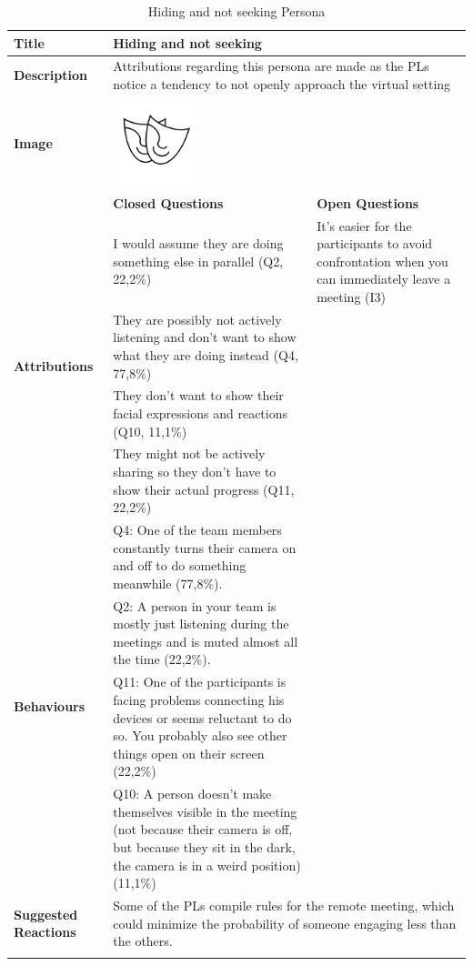 \begin{longtable}[ht]{ p{}  p{} p{} }
\caption{Hiding and not seeking Persona}
\label{tab:hiding}\\
\hline
\textbf{Title} & Hiding and not seeking \\
    \hline
   \textbf{Description} &  \multicolumn{2}{p{.80\textwidth}}{Attributions regarding this persona are made as the PLs notice a tendency to not openly approach the virtual setting} \\
   \hline
   \textbf{Image} &  \includegraphics[valign=t, width=1in, margin=0pt 3pt 0pt 3pt]{figures/Mask.png} \\
   \hline
    & \textbf{Closed Questions} & \textbf{Open Questions} \\
    \hline
    \multirow{4}{4cm}{\textbf{Attributions}}  & I would assume they are doing something else in parallel (Q2, 22,2\%) & It's easier for the participants to avoid confrontation when you can immediately leave a meeting (I3) \\
     & They are possibly not actively listening and don’t want to show what they are doing instead  (Q4, 77,8\%) \\
     & They don’t want to show their facial expressions and reactions (Q10, 11,1\%) \\
     & They might not be actively sharing so they don't have to show their actual progress (Q11, 22,2\%) \\
    \hline
    \multirow{4}{4cm}{\textbf{Behaviours}}  & Q4: One of the team members constantly turns their camera on and off to do something meanwhile (77,8\%). \\
     & Q2: A person in your team is mostly just listening during the meetings and is muted almost all the time (22,2\%). \\
 	 & Q11: One of the participants is facing problems connecting his devices or seems reluctant to do so. You probably also see other things open on their screen (22,2\%)  \\
 	 & Q10: A person doesn’t make themselves visible in the meeting (not because their camera is off, but because they sit in the dark, the camera is in a weird position) (11,1\%) \\
    \hline
     \textbf{Suggested Reactions} & \multicolumn{2}{p{.80\textwidth}}{Some of the PLs compile rules for the remote meeting, which could minimize the probability of someone engaging less than the others.} \\
    \hline
\label{tab:multicol}
\end{longtable}

